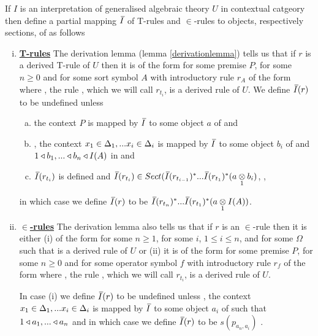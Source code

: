 \begin{definition}
If $I$ is an interpretation of generalised algebraic theory $U$ in contextual catgeory \catcw
then define a
partial mapping $\Ibar$  of T-rules and $\in$-rules to objects, respectively sections, of \catcw
as follows
\begin{enumerate}[(i)] 
\item \underline{\textbf{T-rules}} 
The derivation lemma (lemma \ref{derivationlemma}) tells us that if $r$ is a derived T-rule of $U$  then it is of the form  for some premise $P$, for some $n \geq 0$ and for some sort symbol $A$ with introductory rule $r_A$ of the form  where \foreachi, the rule 
, which we will call $r_{t_i}$, is a derived rule of $U$. 
We define $\Ibar(r)$ to be undefined unless
\begin{enumerate}[(a)]
\item
the context  $P$ is mapped by $\Ibar$ to some object $a$ of \catcw and 

\item
\foreachi, the context $x_1 \in \Delta_1,... x_{i} \in \Delta_{i}$ is mapped by $\Ibar$ to some object $b_i$ of \catcw
and $1 \triangleleft b_1,...\triangleleft b_n \triangleleft I(A)$ in \catcw and
\item
$\Ibar(r_{t_i})$ is defined and $\Ibar(r_{t_i}) \in Sect(\Ibar(r_{t_{i-1}})^*...\Ibar(r_{t_1})^*(\crossx{a}{b_i}{1})$, \foreachi,
\end{enumerate}
in which case we define $\Ibar(r)$ to be $\Ibar(r_{t_n})^*...\Ibar(r_{t_1})^*(\crossx{a}{I(A)}{1})$. 
\item \underline{\textbf{$\boldsymbol {\in}$-rules}} 
The derivation lemma also tells us that if $r$ is an $\in$-rule then it is  
either (i) of the form  for some $n \ge 1$, for some $i$, $1 \leq i \leq n$, 
and for some $\Omega$ such that  is a derived rule of $U$
or (ii) it is of the form  for some premise $P$, for some $n \geq 0$ and for some operator symbol $f$ with introductory rule $r_f$ of the form  where \foreachi, the rule 
, which we will call $r_{t_i}$, is a derived rule of $U$. 

In  case (i) we define $\Ibar(r)$ to be undefined unless \foreachi, the context $x_1 \in \Delta_1,... x_{i} \in \Delta_{i}$ is mapped by $\Ibar$ to some object $a_i$ of \catcw such
that $1 \triangleleft a_1,...\triangleleft a_n$ and in which case we define $\Ibar(r)$ to be
$s(p_{a_n,a_i})$ . 


\end{enumerate}
\end{definition}
